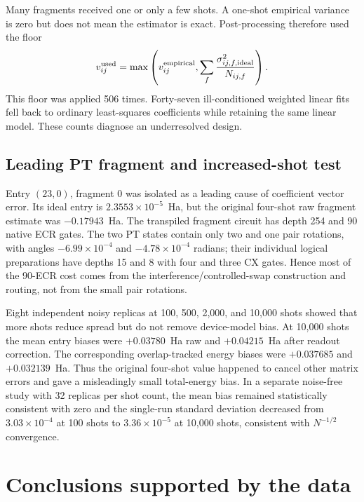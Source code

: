 \documentclass[11pt]{article}
\begin{document}
Many fragments received one or only a few shots.  A one-shot empirical
variance is zero but does not mean the estimator is exact.  Post-processing
therefore used the floor
\[
 v_{ij}^{\rm used}=\max\left(
 v_{ij}^{\rm empirical},
 \sum_f\frac{\sigma_{ij,f,\rm ideal}^2}{N_{ij,f}}
 \right).
\]
This floor was applied 506 times.  Forty-seven ill-conditioned weighted
linear fits fell back to ordinary least-squares coefficients while retaining
the same linear model.  These counts diagnose an underresolved design.

\subsection{Leading PT fragment and increased-shot test}

Entry $(23,0)$, fragment 0 was isolated as a leading cause of coefficient
vector error.  Its ideal entry is $2.3553\times10^{-5}$~Ha, but the original
four-shot raw fragment estimate was $-0.17943$~Ha.  The transpiled fragment
circuit has depth 254 and 90 native ECR gates.  The two PT states contain only
two and one pair rotations, with angles $-6.99\times10^{-4}$ and
$-4.78\times10^{-4}$ radians; their individual logical preparations have
depths 15 and 8 with four and three CX gates.  Hence most of the 90-ECR cost
comes from the interference/controlled-swap construction and routing, not
from the small pair rotations.

Eight independent noisy replicas at 100, 500, 2,000, and 10,000 shots showed
that more shots reduce spread but do not remove device-model bias.  At 10,000
shots the mean entry biases were $+0.03780$~Ha raw and $+0.04215$~Ha after
readout correction.  The corresponding overlap-tracked energy biases were
$+0.037685$ and $+0.032139$~Ha.  Thus the original four-shot value happened
to cancel other matrix errors and gave a misleadingly small total-energy
bias.  In a separate noise-free study with 32 replicas per shot count, the
mean bias remained statistically consistent with zero and the single-run
standard deviation decreased from $3.03\times10^{-4}$ at 100 shots to
$3.36\times10^{-5}$ at 10,000 shots, consistent with $N^{-1/2}$ convergence.

\section{Conclusions supported by the data}
\end{document}
